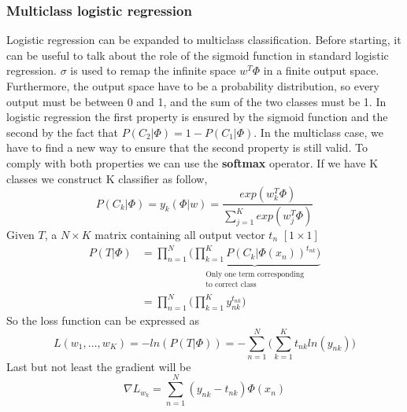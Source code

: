 \documentclass[main.tex]{subfiles}
\begin{document}
\subsubsection{Multiclass logistic regression}
Logistic regression can be expanded to multiclass classification. Before starting, it can be useful to talk about the role of the sigmoid function in standard logistic regression. $\sigma$ is used to remap the infinite space $w^T \Phi$ in a finite output space. Furthermore, the output space have to be a probability distribution, so every output must be between 0 and 1, and the sum of the two classes must be 1. In logistic regression the first property is ensured by the sigmoid function and the second by the fact that $P(C_2|\Phi) = 1- P(C_1|\Phi)$. In the multiclass case, we have to find a new way to ensure that the second property is still valid. To comply with both properties we can use the \textbf{softmax} operator. If we have K classes we construct K classifier as follow,
\begin{equation}
    P(C_k|\Phi) = y_k(\Phi|w) = \frac{exp(w_k^T \Phi)}{\sum_{j=1}^K exp(w_j^T \Phi)}
\end{equation}
Given $T$, a $N \times K$ matrix containing all output vector $t_n$ $[1 \times 1]$
\begin{align*}
    P(T|\Phi) &= \prod_{n=1}^N \underbrace{\bigg( \prod_{k=1}^K P(C_k|\Phi(x_n))^{t_{nk}}\bigg)}_{\substack{\text{Only one term corresponding} \\ \text{to correct class}}} \\
    &= \prod_{n=1}^N \bigg( \prod_{k=1}^K y_{nk}^{t_{nk}}\bigg)
\end{align*}
So the loss function can be expressed as
\begin{equation}
    L(w_1, \dots, w_K) = -ln(P(T|\Phi)) = -\sum_{n=1}^N \bigg( \sum_{k=1}^K t_{nk} ln(y_{nk})\bigg)
\end{equation}
Last but not least the gradient will be
\begin{equation}
    \nabla L_{w_k} = \sum_{n=1}^N (y_{nk} - t_{nk})\Phi(x_n)
\end{equation}
\end{document}
